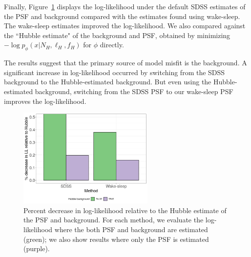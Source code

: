 

Finally, Figure~\ref{fig:loglik_table} displays the log-likelihood under the default SDSS estimates of the PSF and background compared with the estimates found using wake-sleep. 
The wake-sleep estimates improved the log-likelihood.
We also compared against the ``Hubble estimate" of the background and PSF, obtained by minimizing $- \log p_\phi(x | N_{H}, \ell_{H}, f_{H})$ for $\phi$ directly. 

The results suggest that the primary source of model misfit is the background. A significant increase in log-likelihood occurred by switching from the SDSS background to the Hubble-estimated background. 
But even using the Hubble-estimated background, switching from the SDSS PSF to our wake-sleep PSF improves the log-likelihood. 

\begin{figure}[ht]
    \centering
    \includegraphics[width=0.6\textwidth]{figures/loglik_table.png}
    \caption{Percent decrease in log-likelihood relative to the Hubble estimate of the PSF and background. 
    For each method, we evaluate the log-likelihood where the both PSF 
    and background are estimated (green); 
    we also show results where only the PSF is estimated (purple). 
    }
    \label{fig:loglik_table}
\end{figure}

% 


